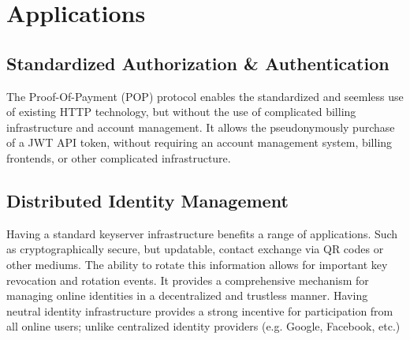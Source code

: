 \documentclass{article}
\begin{document}
\begin{figure}[H]
  \begin{center}
  \end{center}
\end{figure}

\section{Applications}

\subsection{Standardized Authorization \& Authentication}

The Proof-Of-Payment (POP) protocol enables the standardized and seemless use of existing HTTP technology, but without the use of complicated billing infrastructure and account management. It allows the pseudonymously purchase of a JWT\cite{rfc7519} API token, without requiring an account management system, billing frontends, or other complicated infrastructure.

\subsection{Distributed Identity Management}

Having a standard keyserver infrastructure benefits a range of applications. Such as cryptographically secure, but updatable, contact exchange via QR codes or other mediums. The ability to rotate this information allows for important key revocation and rotation events. It provides a comprehensive mechanism for managing online identities in a decentralized and trustless manner. Having neutral identity infrastructure provides a strong incentive for participation from all online users; unlike centralized identity providers (e.g. Google, Facebook, etc.)
\end{document}
